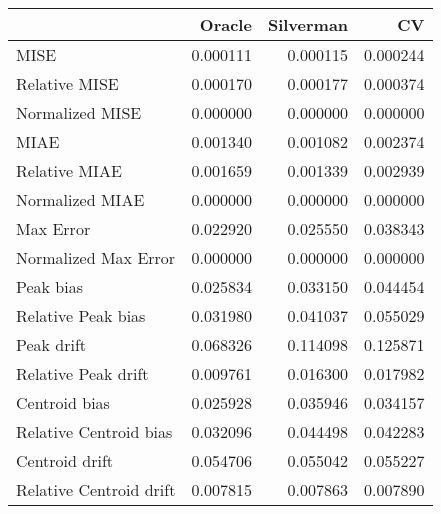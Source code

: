 \begin{tabular}{lrrr}
  \hline
 & Oracle & Silverman & CV \\ 
  \hline
MISE & 0.000111 & 0.000115 & 0.000244 \\ 
  Relative MISE & 0.000170 & 0.000177 & 0.000374 \\ 
  Normalized MISE & 0.000000 & 0.000000 & 0.000000 \\ 
  MIAE & 0.001340 & 0.001082 & 0.002374 \\ 
  Relative MIAE & 0.001659 & 0.001339 & 0.002939 \\ 
  Normalized MIAE & 0.000000 & 0.000000 & 0.000000 \\ 
  Max Error & 0.022920 & 0.025550 & 0.038343 \\ 
  Normalized Max Error & 0.000000 & 0.000000 & 0.000000 \\ 
  Peak bias & 0.025834 & 0.033150 & 0.044454 \\ 
  Relative Peak bias & 0.031980 & 0.041037 & 0.055029 \\ 
  Peak drift & 0.068326 & 0.114098 & 0.125871 \\ 
  Relative Peak drift & 0.009761 & 0.016300 & 0.017982 \\ 
  Centroid bias & 0.025928 & 0.035946 & 0.034157 \\ 
  Relative Centroid bias & 0.032096 & 0.044498 & 0.042283 \\ 
  Centroid drift & 0.054706 & 0.055042 & 0.055227 \\ 
  Relative Centroid drift & 0.007815 & 0.007863 & 0.007890 \\ 
   \hline
\end{tabular}
